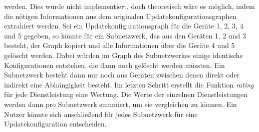 werden. Dies wurde nicht implementiert, doch theoretisch wäre es möglich, indem die nötigen Informationen aus dem originalen Updatekonfigurationsgraphen extrahiert
werden. Sei ein Updatekonfigurationsgraph für die Geräte 1, 2, 3, 4 und 5 gegeben, so könnte für ein Subnetzwerk, das aus den Geräten 1, 2 und 3 besteht, der Graph kopiert und
alle Informationen über die Geräte 4 und 5 gelöscht werden. Dabei würden im Graph des Subnetzwerkes einige identische Konfigurationen entstehen, die dann noch gelöscht werden
müssten.
Ein Subnetzwerk besteht dann nur noch aus Geräten zwischen denen direkt oder indirekt eine Abhängigkeit besteht.
Im letzten Schritt erstellt die Funktion \textit{rating} für jede Dienstleistung eine Wertung. Die Werte der einzelnen Dienstleistungen werden dann pro
Subnetzwerk summiert, um sie vergleichen zu können. Ein Nutzer könnte sich anschließend für jedes Subnetzwerk für eine Updatekonfiguration entscheiden.



































